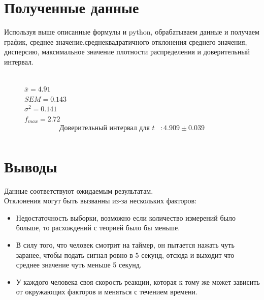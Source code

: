 \documentclass[a4paper]{article}
\begin{document}
\section{Полученные данные}
Используя выше описанные формулы и python, обрабатываем данные и получаем график, среднее значение,среднеквадратичного отклонения среднего значения, дисперсию, максимальное значение плотности распределения и доверительный интервал.
\begin{figure}[H]
	\\
	$\bar{x}=4.91$\\
	$SEM=0.143$\\
	$\sigma^2=0.141$\\
	$f_{max}=2.72$\\

\begin{align*}
\text{Доверительный интервал для } t &: 4.909 \pm 0.039\\
\end{align*}

\end{figure}


\section{Выводы}
Данные соответствуют ожидаемым результатам.\\Отклонения могут быть вызванны из-за нескольких факторов:
\begin{itemize}
	\item Недостаточность выборки, возможно если количество измерений было больше, то расхождений с теорией было бы меньше.
	\item В силу того, что человек смотрит на таймер, он пытается нажать чуть заранее, чтобы подать сигнал ровно в 5 секунд, отсюда и выходит что среднее значение чуть меньше 5 секунд.
	\item У каждого человека своя скорость реакции, которая к тому же может зависить от окружающих факторов и меняться с течением времени.
\end{itemize}
\end{document}
